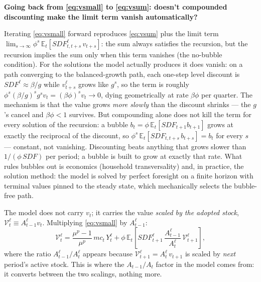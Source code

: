 \documentclass[11pt]{article}
\newcommand{\intuition}[2]{%
  \par\medskip\noindent\hspace*{\fill}%
  \colorbox{intuitionblue}{\parbox{0.94\linewidth}{\textbf{#1}\par\smallskip #2}}%
  \hspace*{\fill}\par\medskip}
\begin{document}
\intuition{Going back from \eqref{eq:vsmall} to \eqref{eq:vsum}: doesn't compounded discounting make the limit term vanish automatically?}{%
Iterating \eqref{eq:vsmall} forward reproduces \eqref{eq:vsum} plus the limit
term $\lim_{s\to\infty}\phi^{s}\,\mathbb{E}_t[\mathit{SDF}^{\ell}_{t,t+s}\,
v_{t+s}]$: the sum always satisfies the recursion, but the recursion implies
the sum only when this term vanishes (the no-bubble condition). For the
solutions the model actually produces it does vanish: on a path converging to
the balanced-growth path, each one-step level discount is
$\mathit{SDF}^{\ell} \approx \beta/g$ while $v^{\ell}_{t+s}$ grows like
$g^{s}$, so the term is roughly $\phi^{s}(\beta/g)^{s}g^{s}v_t =
(\beta\phi)^{s}v_t \to 0$, dying geometrically at rate $\beta\phi$ per
quarter. The mechanism is that the value grows \emph{more slowly} than the
discount shrinks --- the $g$'s cancel and $\beta\phi<1$ survives. But
compounding alone does not kill the term for every solution of the recursion:
a bubble $b_t = \phi\,\mathbb{E}_t[\mathit{SDF}_{t+1}b_{t+1}]$ grows at
exactly the reciprocal of the discount, so
$\phi^{s}\,\mathbb{E}_t[\mathit{SDF}_{t,t+s}\,b_{t+s}] = b_t$ for every $s$
--- constant, not vanishing. Discounting beats anything that grows slower than
$1/(\phi\,\mathit{SDF})$ per period; a bubble is built to grow at exactly that
rate. What rules bubbles out is economics (household transversality) and, in
practice, the solution method: the model is solved by perfect foresight on a
finite horizon with terminal values pinned to the steady state, which
mechanically selects the bubble-free path.}

The model does not carry $v_t$; it carries the value \emph{scaled by the adopted
stock}, $\mathcal{V}^{\ell}_t \equiv A^{\ell}_{t-1} v_t$. Multiplying
\eqref{eq:vsmall} by $A^{\ell}_{t-1}$:
\begin{equation}\label{eq:Vlevel}
    \mathcal{V}^{\ell}_t = \frac{\mu^{p}-1}{\mu^{p}}\,mc_t\,Y^{\ell}_t
    + \phi\,\mathbb{E}_t\!\left[\mathit{SDF}^{\ell}_{t+1}\,
    \frac{A^{\ell}_{t-1}}{A^{\ell}_{t}}\,\mathcal{V}^{\ell}_{t+1}\right],
\end{equation}
where the ratio $A^{\ell}_{t-1}/A^{\ell}_{t}$ appears because
$\mathcal{V}^{\ell}_{t+1} = A^{\ell}_{t}\,v_{t+1}$ is scaled by \emph{next}
period's active stock. This is where the $A_{t-1}/A_t$ factor in the model comes
from: it converts between the two scalings, nothing more.
\end{document}
